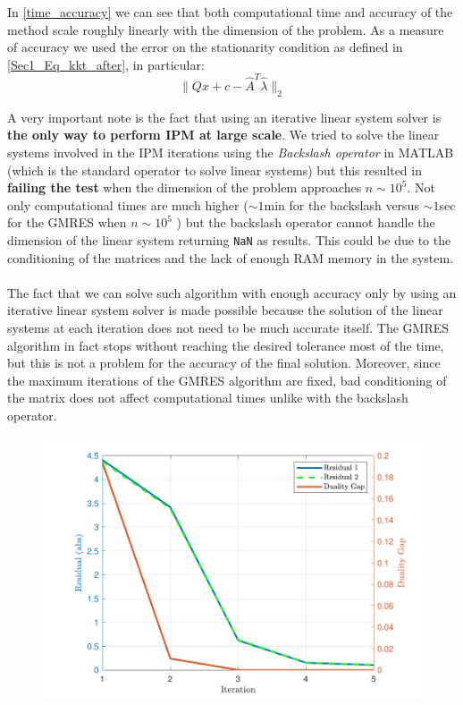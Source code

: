 \noindent In \ref{time_accuracy} we can see that both computational time and accuracy of the method scale roughly linearly with the dimension of the problem. As a measure of accuracy we used the error on the stationarity condition as defined in \ref{Sec1_Eq_kkt_after}, in particular:
\[ \| Qx + c - \hat{A}^T \hat{\lambda} \| _ 2\]

\noindent A very important note is the fact that using an iterative linear system solver is \textbf{the only way to perform IPM at large scale}. We tried to solve the linear systems involved in the IPM iterations using the \textit{Backslash operator} in MATLAB (which is the standard operator to solve linear systems) but this resulted in \textbf{failing the test} when the dimension of the problem approaches \(n \sim 10^5\). Not only computational times are much higher (\(\sim 1\)min for the backslash versus \(\sim 1\)sec for the GMRES when \(n \sim 10^5\) ) but the backslash operator cannot handle the dimension of the linear system returning \texttt{NaN} as results. This could be due to the conditioning of the matrices and the lack of enough RAM memory in the system.
\\
\\
\noindent The fact that we can solve such algorithm with enough accuracy only by using an iterative linear system solver is made possible because the solution of the linear systems at each iteration does not need to be much accurate itself. The GMRES algorithm in fact stops without reaching the desired tolerance most of the time, but this is not a problem for the accuracy of the final solution. Moreover, since the maximum iterations of the GMRES algorithm are fixed, bad conditioning of the matrix does not affect computational times unlike  with the backslash operator.

\begin{figure}[H]
	\centering
	\includegraphics[scale = 0.8]{pictures/res_vs_duality.pdf}
\end{figure}